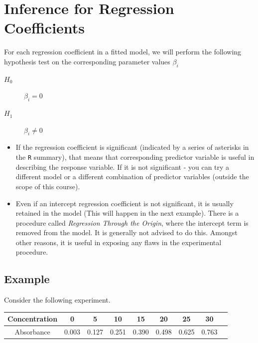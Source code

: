 \documentclass[a4paper,12pt]{article}
\begin{document}
\large
\section{Inference for Regression Coefficients}
For each regression coefficient in a fitted model, we will perform the following hypothesis test on the corresponding parameter values $\beta_i$

\begin{framed}
	\begin{description}
		\item[ $H_0$] $\beta_i = 0 $
		\item[ $H_1$] $\beta_i \neq 0$
	\end{description}
\end{framed}
\begin{itemize}
\item If the regression coefficient is significant (indicated by a series of asterisks in the \texttt{R} summary), that means that corresponding predictor variable is useful in describing the response variable. If it is not significant - you can try a different model or a different combination of predictor variables (outside the scope of this course).

\item Even if an intercept regression coefficient is not significant, it is usually retained in the model (This will happen in the next example). There is a procedure called \textit{Regression Through the Origin}, where the intercept term is removed from the model. It is generally not advised to do this. Amongst other reasons, it is useful in exposing any flaws in the experimental procedure.
\end{itemize}
\newpage


\subsection{Example}	
Consider the following experiment.
\begin{center}
\begin{tabular}{|c|c|c|c|c|c|c|c|c|}
	\hline Concentration  & 0 & 5 & 10 & 15 & 20 & 25 & 30 \\ \hline
	Absorbance &  0.003 &  0.127 & 0.251 & 0.390 & 0.498 & 0.625 & 0.763 \\ \hline
\end{tabular} 
\end{center} 
\end{document}
